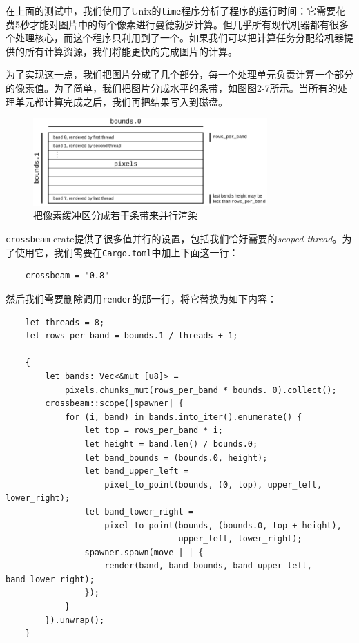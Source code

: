 在上面的测试中，我们使用了Unix的\texttt{time}程序分析了程序的运行时间：它需要花费5秒才能对图片中的每个像素进行曼德勃罗计算。但几乎所有现代机器都有很多个处理核心，而这个程序只利用到了一个。如果我们可以把计算任务分配给机器提供的所有计算资源，我们将能更快的完成图片的计算。

为了实现这一点，我们把图片分成了几个部分，每一个处理单元负责计算一个部分的像素值。为了简单，我们把图片分成水平的条带，如图\hyperref[f2-7]{图2-7}所示。当所有的处理单元都计算完成之后，我们再把结果写入到磁盘。
\begin{figure}[htbp]
    \centering
    \includegraphics[width=0.8\textwidth]{../img/f2-7.png}
    \caption{把像素缓冲区分成若干条带来并行渲染}
    \label{f2-7}
\end{figure}

\texttt{crossbeam} crate提供了很多值并行的设置，包括我们恰好需要的\emph{scoped thread}。为了使用它，我们需要在\texttt{Cargo.toml}中加上下面这一行：
\begin{verbatim}
    crossbeam = "0.8"
\end{verbatim}

然后我们需要删除调用\texttt{render}的那一行，将它替换为如下内容：
\begin{verbatim}
    let threads = 8;
    let rows_per_band = bounds.1 / threads + 1;

    {
        let bands: Vec<&mut [u8]> =
            pixels.chunks_mut(rows_per_band * bounds. 0).collect();
        crossbeam::scope(|spawner| {
            for (i, band) in bands.into_iter().enumerate() {
                let top = rows_per_band * i;
                let height = band.len() / bounds.0;
                let band_bounds = (bounds.0, height);
                let band_upper_left =
                    pixel_to_point(bounds, (0, top), upper_left, lower_right);
                let band_lower_right =
                    pixel_to_point(bounds, (bounds.0, top + height),
                                   upper_left, lower_right);
                spawner.spawn(move |_| {
                    render(band, band_bounds, band_upper_left, band_lower_right);
                });
            }
        }).unwrap();
    }
\end{verbatim}

